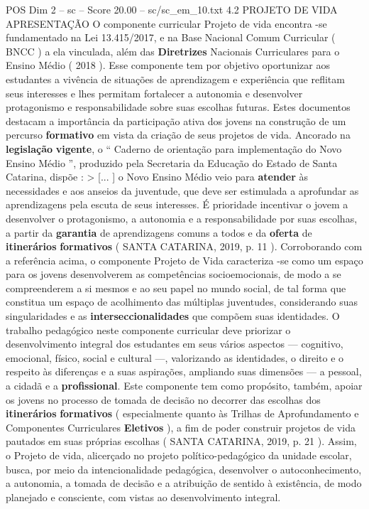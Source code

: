 \begin{textsample}{POS Dim 2 – sc – Score 20.00 – sc/sc\_em\_10.txt}  \label{ex:f2_pos_019}
4.2 PROJETO DE VIDA APRESENTAÇÃO O componente curricular Projeto de vida encontra -se fundamentado na Lei 13.415/2017, e na Base Nacional Comum Curricular ( BNCC ) a ela vinculada, além das \textbf{Diretrizes} Nacionais Curriculares para o Ensino Médio ( 2018 ).
Esse componente tem por objetivo oportunizar aos estudantes a vivência de situações de aprendizagem e experiência que reflitam seus interesses e lhes permitam fortalecer a autonomia e desenvolver protagonismo e responsabilidade sobre suas escolhas futuras.
Estes documentos destacam a importância da participação ativa dos jovens na construção de um percurso \textbf{formativo} em vista da criação de seus projetos de vida.
Ancorado na \textbf{legislação} \textbf{vigente}, o “ Caderno de orientação para implementação do Novo Ensino Médio ”, produzido pela Secretaria da Educação do Estado de Santa Catarina, dispõe : > [... ] o Novo Ensino Médio veio para \textbf{atender} às necessidades e aos anseios da juventude, que deve ser estimulada a aprofundar as aprendizagens pela escuta de seus interesses.
É prioridade incentivar o jovem a desenvolver o protagonismo, a autonomia e a responsabilidade por suas escolhas, a partir da \textbf{garantia} de aprendizagens comuns a todos e da \textbf{oferta} de \textbf{itinerários} \textbf{formativos} ( SANTA CATARINA, 2019, p. 11 ).
Corroborando com a referência acima, o componente Projeto de Vida caracteriza -se como um espaço para os jovens desenvolverem as competências socioemocionais, de modo a se compreenderem a si mesmos e ao seu papel no mundo social, de tal forma que constitua um espaço de acolhimento das múltiplas juventudes, considerando suas singularidades e as \textbf{interseccionalidades} que compõem suas identidades.
O trabalho pedagógico neste componente curricular deve priorizar o desenvolvimento integral dos estudantes em seus vários aspectos — cognitivo, emocional, físico, social e cultural —, valorizando as identidades, o direito e o respeito às diferenças e a suas aspirações, ampliando suas dimensões — a pessoal, a cidadã e a \textbf{profissional}.
Este componente tem como propósito, também, apoiar os jovens no processo de tomada de decisão no decorrer das escolhas dos \textbf{itinerários} \textbf{formativos} ( especialmente quanto às Trilhas de Aprofundamento e Componentes Curriculares \textbf{Eletivos} ), a fim de poder construir projetos de vida pautados em suas próprias escolhas ( SANTA CATARINA, 2019, p. 21 ).
Assim, o Projeto de vida, alicerçado no projeto político-pedagógico da unidade escolar, busca, por meio da intencionalidade pedagógica, desenvolver o autoconhecimento, a autonomia, a tomada de decisão e a atribuição de sentido à existência, de modo planejado e consciente, com vistas ao desenvolvimento integral.

\end{textsample}
